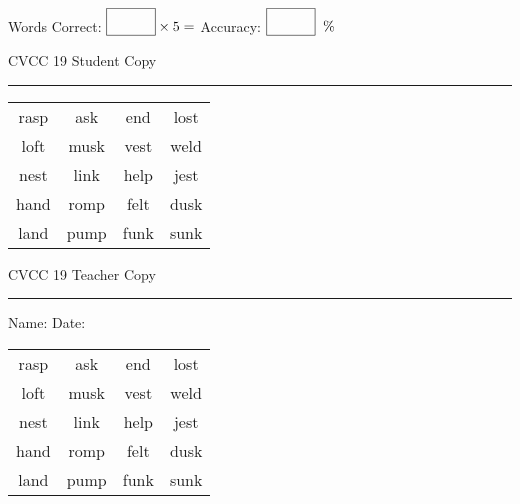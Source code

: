 \documentclass{memoir}
\begin{document}
\small

Words Correct: $\fbox{\phantom{\huge 100}} \times 5 = $ Accuracy: $\fbox{\phantom{\huge 100}}\;\; \%$ 

\vfill

\newpage


\footnotesize \noindent
CVCC 19 \hfill Student Copy
\smallskip
\hrule

\Large

\setlength{\tabcolsep}{14pt}
\def\arraystretch{3}

{\selectfont


\begin{vplace}[0.5]
\begin{center}
\begin{tabular}{cccc}
rasp & ask  & end & lost \\
loft & musk & vest & weld \\
nest & link & help & jest \\
hand & romp & felt & dusk \\
land & pump & funk & sunk \\
\end{tabular}
\end{center}
\end{vplace}

}

\newpage

\footnotesize \noindent
CVCC 19 \hfill Teacher Copy
\smallskip
\hrule

\small

\vfill

\noindent
Name: \underline{\hspace{1.75in}} \hfill Date: \underline{\hspace{1in}}

\Large

{\selectfont


\begin{vplace}[0.5]
\begin{center}
\begin{tabular}{cccc}
rasp & ask  & end & lost \\
loft & musk & vest & weld \\
nest & link & help & jest \\
hand & romp & felt & dusk \\
land & pump & funk & sunk \\
\end{tabular}
\end{center}
\end{vplace}



}
\end{document}
